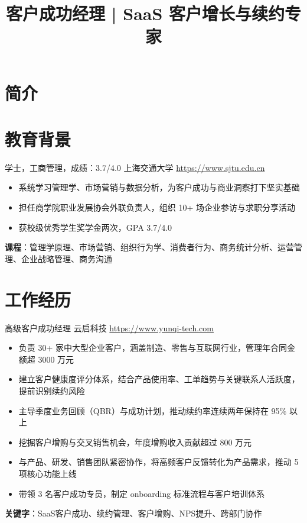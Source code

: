 \documentclass[a4paper, serif, 10pt]{moderncv}
\title{客户成功经理 | SaaS 客户增长与续约专家}
\begin{document}
\maketitle

\section{简介}

\section{教育背景}

        {学士，工商管理，成绩：3.7/4.0}
        {上海交通大学}
        {\url{https://www.sjtu.edu.cn}}
        {}
        {\begin{itemize}
\item 系统学习管理学、市场营销与数据分析，为客户成功与商业洞察打下坚实基础
\item 担任商学院职业发展协会外联负责人，组织 10+ 场企业参访与求职分享活动
\item 获校级优秀学生奖学金两次，GPA 3.7/4.0
\end{itemize}
\textbf{课程}：管理学原理、市场营销、组织行为学、消费者行为、商务统计分析、运营管理、企业战略管理、商务沟通}
\section{工作经历}

        {高级客户成功经理}
        {云启科技}
        {\url{https://www.yunqi-tech.com}}
        {}
        {\begin{itemize}
\item 负责 30+ 家中大型企业客户，涵盖制造、零售与互联网行业，管理年合同金额超 3000 万元
\item 建立客户健康度评分体系，结合产品使用率、工单趋势与关键联系人活跃度，提前识别续约风险
\item 主导季度业务回顾（QBR）与成功计划，推动续约率连续两年保持在 95\% 以上
\item 挖掘客户增购与交叉销售机会，年度增购收入贡献超过 800 万元
\item 与产品、研发、销售团队紧密协作，将高频客户反馈转化为产品需求，推动 5 项核心功能上线
\item 带领 3 名客户成功专员，制定 onboarding 标准流程与客户培训体系
\end{itemize}
\textbf{关键字}：SaaS客户成功、续约管理、客户增购、NPS提升、跨部门协作}
\end{document}
